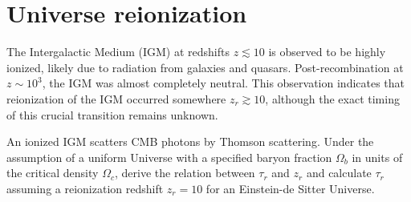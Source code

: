 \section{Universe reionization}

The Intergalactic Medium (IGM) at redshifts $z \lesssim 10$ is observed to be highly ionized, likely due to radiation from galaxies and quasars. Post-recombination at $z \sim 10^3$, the IGM was almost completely neutral. This observation indicates that reionization of the IGM occurred somewhere $z_r \gtrsim 10$, although the exact timing of this crucial transition remains unknown. 

An ionized IGM scatters CMB photons by Thomson scattering. Under the assumption of a uniform Universe with a specified baryon fraction $\Omega_b$ in units of the critical density $\Omega_c$, derive the relation between $\tau_r$ and $z_r$ and calculate $\tau_r$ assuming a reionization redshift $z_r = 10$ for an Einstein-de Sitter Universe.
